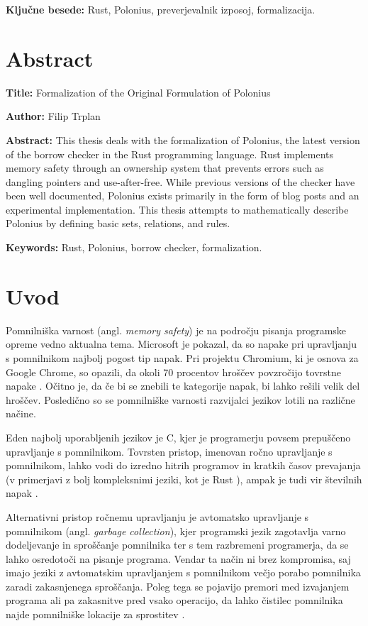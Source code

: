 \documentclass[a4paper,12pt,openright]{book}
\newcommand{\ttitleEn}{Formalization of the Original Formulation of Polonius}
\newcommand{\tauthor}{Filip Trplan}
\newcommand{\tkeywords}{Rust, Polonius, preverjevalnik izposoj, formalizacija}
\newcommand{\tkeywordsEn}{Rust, Polonius, borrow checker, formalization}
\newcommand{\angl}[1]{(angl. \textit{#1})}
\newcommand{\clearemptydoublepage}{\newpage{\pagestyle{empty}\cleardoublepage}}
\begin{document}
\noindent\textbf{Ključne besede:} \tkeywords.
\clearemptydoublepage
\chapter*{Abstract}
\noindent\textbf{Title:} \ttitleEn
\bigskip

\noindent\textbf{Author:} \tauthor
\bigskip

\noindent\textbf{Abstract:}
\noindent This thesis deals with the formalization of Polonius, the latest version of the borrow checker in the Rust programming language. Rust implements memory safety through an ownership system that prevents errors such as dangling pointers and use-after-free. While previous versions of the checker have been well documented, Polonius exists primarily in the form of blog posts and an experimental implementation. This thesis attempts to mathematically describe Polonius by defining basic sets, relations, and rules.
\bigskip

\noindent\textbf{Keywords:} \tkeywordsEn.
\clearemptydoublepage
\mainmatter
\setcounter{page}{1}
\pagestyle{fancy}

\chapter{Uvod}
Pomnilniška varnost \angl{memory safety} je na področju pisanja programske opreme vedno aktualna tema. Microsoft je pokazal, da so napake pri upravljanju s pomnilnikom najbolj pogost tip napak\cite{Microsoft70Percent}. Pri projektu Chromium, ki je osnova za Google Chrome, so opazili, da okoli 70 procentov hroščev povzročijo tovrstne napake \cite{MemorySafetya}. Očitno je, da če bi se znebili te kategorije napak, bi lahko rešili velik del hroščev. Posledično so se pomnilniške varnosti razvijalci jezikov lotili na različne načine.

Eden najbolj uporabljenih jezikov je C, kjer je programerju povsem prepuščeno upravljanje s pomnilnikom.
Tovrsten pristop, imenovan ročno upravljanje s pomnilnikom, lahko vodi do izredno hitrih programov in kratkih časov prevajanja (v primerjavi z bolj kompleksnimi jeziki, kot je Rust \cite{glazarCodingRustBad2023}), ampak je tudi vir številnih napak \cite{MemorySafetya}.

Alternativni pristop ročnemu upravljanju je avtomatsko upravljanje s pomnilnikom \angl{garbage collection}, kjer programski jezik zagotavlja varno dodeljevanje in sproščanje pomnilnika ter s tem razbremeni programerja, da se lahko osredotoči na pisanje programa. Vendar ta način ni brez kompromisa, saj imajo jeziki z avtomatskim upravljanjem s pomnilnikom večjo porabo pomnilnika zaradi zakasnjenega sproščanja. Poleg tega se pojavijo premori med izvajanjem programa ali pa zakasnitve pred vsako operacijo, da lahko čistilec pomnilnika najde pomnilniške lokacije za sprostitev \cite{bakerListProcessingReal1978}.
\end{document}
